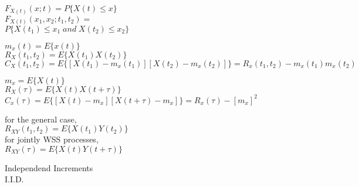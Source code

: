

$F_{X(t)}(x;t)=P\{X(t) \leq x\}$ \\
$F_{X(t)}(x_1,x_2;t_1,t_2)=$ \\ $P\{X(t_1)\leq x_1 \; and \; X(t_2) \leq x_2\}$

$m_x(t)=E\{x(t)\}$ \\
$R_X(t_1,t_2)=E\{X(t_1)X(t_2)\}$ \\
$C_X(t_1,t_2)=E\{[X(t_1)-m_x(t_1)][X(t_2)-m_x(t_2)]\}=R_x(t_1,t_2)-m_x(t_1)m_x(t_2)$

$m_x=E\{X(t)\} $\\
$R_X(\tau)=E\{X(t)X(t+\tau)\}$ \\
$C_x(\tau) =E\{[X(t)-m_x] [X(t+\tau)-m_x]\}= R_x(\tau)-{[m_x]} ^2$ 

for the general case, \\
$R_{XY}(t_1,t_2)=E\{X(t_1)Y(t_2)\}$ \\
for jointly WSS processes, \\
$R_{XY}(\tau)=E\{X(t)Y(t+\tau)\}$


Independend Increments \\
I.I.D.
